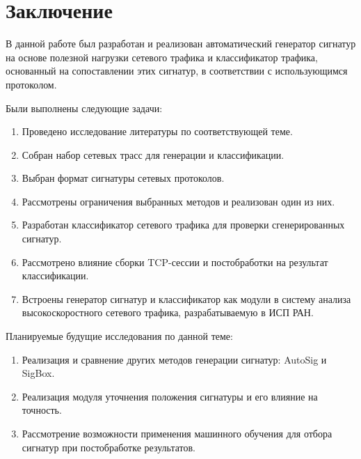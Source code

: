 \section{Заключение}
\label{sec:Section5} 

В данной работе был разработан и реализован автоматический генератор сигнатур на основе полезной нагрузки сетевого трафика
и классификатор трафика, основанный на сопоставлении этих сигнатур, в соответствии с использующимся протоколом.

Были выполнены следующие задачи:
\begin{enumerate}
    \item Проведено исследование литературы по соответствующей теме.
    \item Собран набор сетевых трасс для генерации и классификации.
    \item Выбран формат сигнатуры сетевых протоколов.
    \item Рассмотрены ограничения выбранных методов и реализован один из них.
    \item Разработан классификатор сетевого трафика для проверки сгенерированных сигнатур.
    \item Рассмотрено влияние сборки TCP-сессии и постобработки на результат классификации.
    \item Встроены генератор сигнатур и классификатор как модули в систему анализа высокоскоростного сетевого трафика, разрабатываемую в ИСП РАН.
\end{enumerate}

Планируемые будущие исследования по данной теме:

\begin{enumerate}
    \item Реализация и сравнение других методов генерации сигнатур: AutoSig и SigBox.
    \item Реализация модуля уточнения положения сигнатуры и его влияние на точность.
    \item Рассмотрение возможности применения машинного обучения для отбора сигнатур при постобработке результатов.
\end{enumerate}

\newpage
